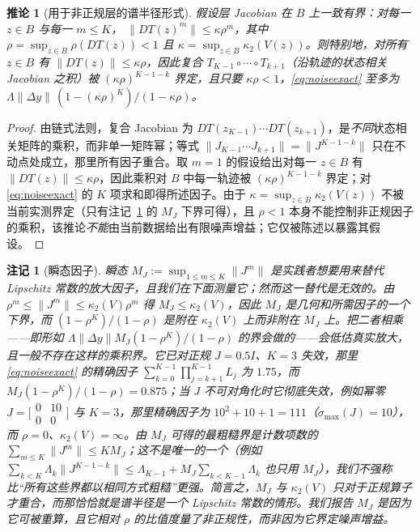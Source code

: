 \documentclass[UTF8,a4paper,11pt]{ctexart}
\newcommand{\norm}[1]{\lVert #1 \rVert}
\newtheorem{Corollary}{推论}[section]
\newtheorem{Remark}{注记}[section]
\begin{document}
\begin{Corollary}[用于非正规层的谱半径形式]\label{cor:noisenormal}
假设层 Jacobian 在 $B$ 上一致有界：对每一 $z\in B$ 与每一 $m\le K$，
$\norm{DT(z)^{m}}\le\kappa\rho^{m}$，其中 $\rho=\sup_{z\in B}\rho(DT(z))<1$ 且
$\kappa=\sup_{z\in B}\kappa_2(V(z))$。则特别地，对所有 $z\in B$ 有 $\norm{DT(z)}\le\kappa\rho$，因此复合 $T_{K-1}\circ\cdots\circ T_{k+1}$（沿轨迹的状态相关 Jacobian 之积）被 $(\kappa\rho)^{K-1-k}$ 界定，且只要 $\kappa\rho<1$，\eqref{eq:noiseexact} 至多为
$\Lambda\norm{\Delta y}\,(1-(\kappa\rho)^{K})/(1-\kappa\rho)$。
\end{Corollary}
\begin{proof}
由链式法则，复合 Jacobian 为 $DT(z_{K-1})\cdots DT(z_{k+1})$，是\emph{不同}状态相关矩阵的乘积，而非单一矩阵幂；等式 $\norm{J_{K-1}\cdots J_{k+1}}=\norm{J^{K-1-k}}$ 只在不动点处成立，那里所有因子重合。取 $m=1$ 的假设给出对每一 $z\in B$ 有 $\norm{DT(z)}\le\kappa\rho$，因此乘积对 $B$ 中每一轨迹被 $(\kappa\rho)^{K-1-k}$ 界定；对 \eqref{eq:noiseexact} 的 $K$ 项求和即得所述因子。由于 $\kappa=\sup_{z\in B}\kappa_2(V(z))$ 不被当前实测界定（只有注记~\ref{rem:mj} 的 $M_J$ 下界可得），且 $\rho<1$ 本身不能控制非正规因子的乘积，该推论\emph{不能}由当前数据给出有限噪声增益；它仅被陈述以暴露其假设。
\end{proof}
\begin{Remark}[瞬态因子]\label{rem:mj}
瞬态 $M_J:=\sup_{1\le m\le K}\norm{J^{m}}$ 是实践者想要用来替代 Lipschitz 常数的放大因子，且我们在下面测量它；然而这一替代是\emph{无效的}。由 $\rho^{m}\le\norm{J^{m}}\le\kappa_2(V)\rho^{m}$ 得 $M_J\le\kappa_2(V)$，因此 $M_J$ 是几何和所需因子的一个\emph{下}界，而 $(1-\rho^{K})/(1-\rho)$ 是附在 $\kappa_2(V)$ 上而非附在 $M_J$ 上。把二者相乘——即形如 $\Lambda\norm{\Delta y}M_J(1-\rho^{K})/(1-\rho)$ 的界会做的——会\emph{低估}真实放大，且一般不存在这样的乘积界。它已对正规 $J=0.5I$、$K=3$ 失效，那里 \eqref{eq:noiseexact} 的精确因子 $\sum_{k=0}^{K-1}\prod_{j=k+1}^{K-1}L_j$ 为 $1.75$，而 $M_J(1-\rho^{K})/(1-\rho)=0.875$；当 $J$ 不可对角化时它彻底失效，例如幂零 $J=\bigl[\begin{smallmatrix}0&10\\0&0\end{smallmatrix}\bigr]$ 与 $K=3$，那里精确因子为 $10^2+10+1=111$（$\sigma_{\max}(J)=10$），而 $\rho=0$、$\kappa_2(V)=\infty$。由 $M_J$ 可得的最粗糙界是计数项数的 $\sum_{m\le K}\norm{J^{m}}\le K M_J$；这不是唯一的一个（例如 $\sum_{k<K}\Lambda_k\norm{J^{K-1-k}}\le\Lambda_{K-1}+M_J\sum_{k<K-1}\Lambda_k$ 也只用 $M_J$），我们不强称比“所有这些界都以相同方式粗糙”更强。简言之，$M_J$ 与 $\kappa_2(V)$ 只对于正规算子才重合，而那恰恰就是谱半径\emph{是}一个 Lipschitz 常数的情形。我们报告 $M_J$ 是因为它可被重算，且它相对 $\rho$ 的比值度量了非正规性，而非因为它界定噪声增益。
\end{Remark}
\end{document}
